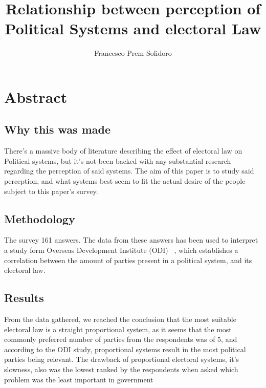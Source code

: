 \documentclass{article}
\title{Relationship between perception of Political Systems and electoral Law}
\author{Francesco Prem Solidoro}
\begin{document}
\maketitle
\section{Abstract} %
\label{sec:Abstract}
\subsection{Why this was made} %
\label{sub:Reason why this was made}

There's a massive body of literature describing the effect of electoral law on Political systems, but it's not been backed with any substantial research regarding the perception of said systems. The aim of this paper is to study said perception, and what systems best seem to fit the actual desire of the people subject to this paper's survey.

\subsection{Methodology} %
\label{sec:Methodology}
The survey 161 answers. The data from these answers has been used to interpret a study form Overseas Development Institute (ODI) ~\cite{ODI-electoral-systems}, which establishes a correlation between the amount of parties present in a political system, and its electoral law.


\subsection{Results}
From the data gathered, we reached the conclusion that the most suitable electoral law is a straight proportional system, as it seems that the most commonly preferred number of parties from the respondents was of 5, and according to the ODI study, proportional systems result in the most political parties being relevant. The drawback of proportional electoral systems, it's slowness, also was the lowest ranked by the respondents when asked which problem was the least important in government

\printbibliography
	
\end{document}
